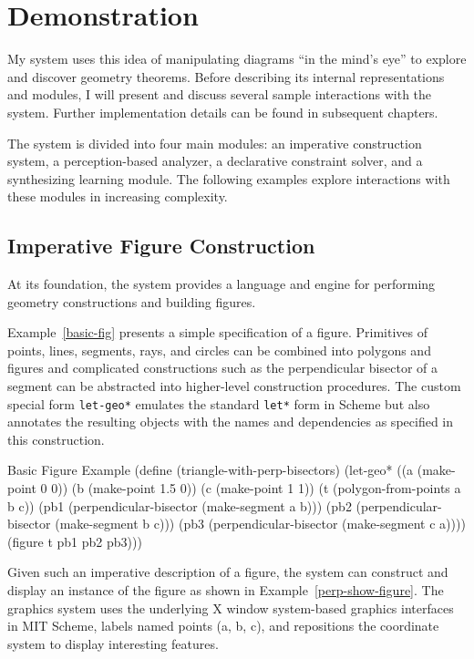 \chapter{Demonstration}
\label{chap:demo}

My system uses this idea of manipulating diagrams ``in the mind's
eye'' to explore and discover geometry theorems. Before describing its
internal representations and modules, I will present and discuss
several sample interactions with the system. Further implementation
details can be found in subsequent chapters.

The system is divided into four main modules: an imperative
construction system, a perception-based analyzer, a declarative
constraint solver, and a synthesizing learning module. The following
examples explore interactions with these modules in increasing
complexity.

\section{Imperative Figure Construction}

At its foundation, the system provides a language and engine for
performing geometry constructions and building figures.

Example~\ref{basic-fig} presents a simple specification of a
figure. Primitives of points, lines, segments, rays, and circles can
be combined into polygons and figures and complicated constructions
such as the perpendicular bisector of a segment can be abstracted into
higher-level construction procedures. The custom special form
\texttt{let-geo*} emulates the standard \texttt{let*} form in Scheme
but also annotates the resulting objects with the names and
dependencies as specified in this construction.

\begin{code-example}
[label=basic-fig]
{Basic Figure Example}
(define (triangle-with-perp-bisectors)
  (let-geo* ((a (make-point 0 0))
             (b (make-point 1.5 0))
             (c (make-point 1 1))
             (t (polygon-from-points a b c))
             (pb1 (perpendicular-bisector (make-segment a b)))
             (pb2 (perpendicular-bisector (make-segment b c)))
             (pb3 (perpendicular-bisector (make-segment c a))))
    (figure t pb1 pb2 pb3)))
\end{code-example}

Given such an imperative description of a figure, the system can
construct and display an instance of the figure as shown in
Example~\ref{perp-show-figure}. The graphics system uses the
underlying X window system-based graphics interfaces in MIT Scheme,
labels named points (a, b, c), and repositions the coordinate system
to display interesting features.

